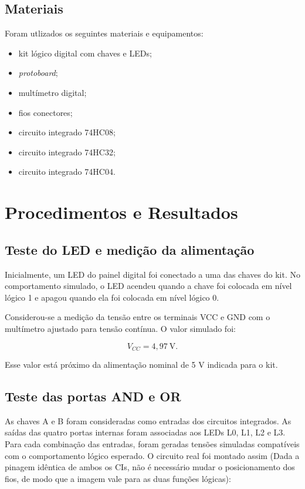 \documentclass[12pt]{article}
\begin{document}
\subsection{Materiais}
\label{sec:materiais}

Foram utlizados os seguintes materiais e equipamentos:

\begin{itemize}
    \item kit lógico digital com chaves e LEDs;
    \item \textit{protoboard};
    \item multímetro digital;
    \item fios conectores;
    \item circuito integrado 74HC08;
    \item circuito integrado 74HC32;
    \item circuito integrado 74HC04.
\end{itemize}

\section{Procedimentos e Resultados}
\label{sec:procedimentos}

\subsection{Teste do LED e medição da alimentação}
\label{sec:alimentacao}

Inicialmente, um LED do painel digital foi conectado a uma das chaves do kit.
No comportamento simulado, o LED acendeu quando a chave foi colocada em nível
lógico 1 e apagou quando ela foi colocada em nível lógico 0.

Considerou-se a medição da tensão entre os terminais VCC e GND com o multímetro
ajustado para tensão contínua. O valor simulado foi:

\begin{equation}
    V_{CC}=4{,}97\ \text{V}.
\end{equation}

Esse valor está próximo da alimentação nominal de 5 V indicada para o kit.

\subsection{Teste das portas AND e OR}
\label{sec:portas}

As chaves A e B foram consideradas como entradas dos circuitos integrados. As
saídas das quatro portas internas foram associadas aos LEDs L0, L1, L2 e L3.
Para cada combinação das entradas, foram geradas tensões simuladas compatíveis
com o comportamento lógico esperado. O circuito real foi montado assim (Dada a pinagem idêntica de ambos os CIs, não é necessário mudar o posicionamento dos fios, de modo que a imagem vale para as duas funções lógicas):
\end{document}
